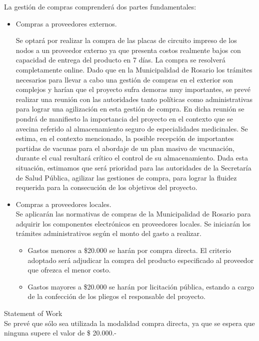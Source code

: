\documentclass[11pt]{proyecto}
\begin{document}
La gestión de compras comprenderá dos partes fundamentales:
\begin{itemize}
\item Compras a proveedores externos.

Se optará por realizar la compra de las placas de circuito impreso de los nodos a un proveedor externo ya que presenta costos realmente bajos con capacidad de entrega del producto en 7 días. La compra se resolverá completamente online.
Dado que en la Municipalidad de Rosario los trámites necesarios para llevar a cabo una gestión de compras en el exterior son complejos y harían que el proyecto sufra demoras muy importantes, se prevé realizar una reunión con las autoridades tanto políticas como administrativas para lograr una agilización en esta gestión de compra. En dicha reunión se pondrá de manifiesto la importancia del proyecto en el contexto que se avecina referido al almacenamiento seguro de especialidades medicinales.
Se estima, en el contexto mencionado, la posible recepción de importantes partidas de vacunas para el abordaje de un plan masivo de vacunación, durante el cual resultará crítico el control de su almacenamiento.
Dada esta situación, estimamos que será prioridad para las autoridades de la Secretaría de Salud Pública, agilizar las gestiones de compra, para lograr la fluidez requerida para la consecución de los objetivos del proyecto.

\item Compras a proveedores locales.\\
Se aplicarán las normativas de compras de la Municipalidad de Rosario para adquirir los componentes electrónicos en proveedores locales. Se iniciarán los trámites administrativos según el monto del gasto a realizar.
\begin{itemize}
\item Gastos menores a \$20.000 se harán por compra directa. El criterio adoptado será adjudicar la compra del producto especificado al proveedor que ofrezca el menor costo.
\item Gastos mayores a \$20.000 se harán por licitación pública, estando a cargo de la confección de los pliegos el responsable del proyecto. 
\end{itemize}
\end{itemize}

Statement of Work\\
Se prevé que sólo sea utilizada la modalidad compra directa, ya que se espera que ninguna supere el valor de \$ 20.000.-
\end{document}
